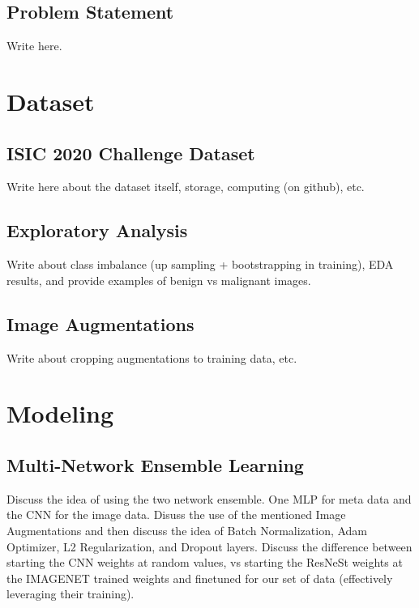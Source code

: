\documentclass [MAS] {uclathes}
\begin{document}
\section{Problem Statement}

Write here.


\chapter{Dataset}

\section{ISIC 2020 Challenge Dataset}

Write here about the dataset itself, storage, computing (on github), etc. \cite{ISIC}

\section{Exploratory Analysis}

Write about class imbalance (up sampling + bootstrapping in training), EDA results, and provide examples of benign vs malignant images.

\section{Image Augmentations}

Write about cropping augmentations to training data, etc.


\chapter{Modeling}

\section{Multi-Network Ensemble Learning}

Discuss the idea of using the two network ensemble. One MLP for meta data and the CNN for the image data. Disuss the use of the mentioned Image Augmentations and then discuss the idea of Batch Normalization, Adam Optimizer, L2 Regularization, and Dropout layers. Discuss the difference between starting the CNN weights at random values, vs starting the ResNeSt weights at the IMAGENET trained weights and finetuned for our set of data (effectively leveraging their training).
\end{document}
